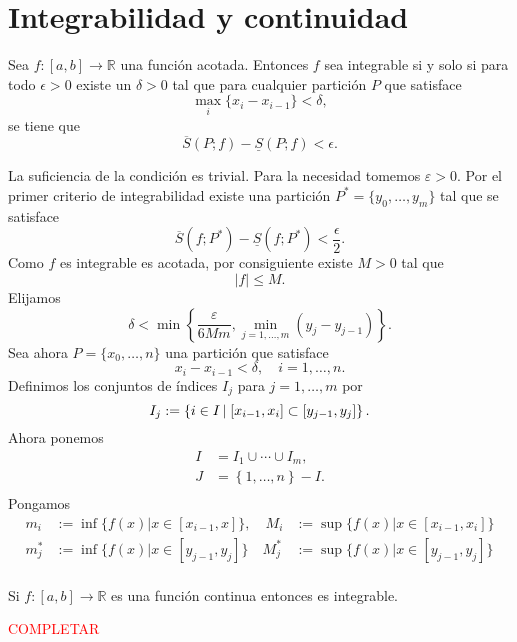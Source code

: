 \section{Integrabilidad y continuidad}


 
\begin{teorema}{}  Sea $f:[a,b]\to\mathbb{R}$ una función acotada. Entonces  $f$ sea integrable si y solo si para todo $\epsilon>0$ existe un $\delta>0$ tal que para cualquier partición $P$ que satisface
\[\max_i\{x_i-x_{i-1}\}<\delta,\]
se tiene que
\begin{equation}\label{eq:Crit1Int}
 \overline{S}(P;f)-\underline{S}(P;f)<\epsilon.
\end{equation}
 
\end{teorema}
\begin{demo} La suficiencia de la condición es trivial. Para la necesidad tomemos $\varepsilon>0$. Por el primer criterio de integrabilidad existe una partición $P^*=\{y_0,\ldots,y_m\}$ tal que se satisface
\[
 \overline{S}(f;P^*)-\underline{S}(f;P^*)<\frac{\epsilon}{2}.
\]
Como $f$ es integrable es acotada, por consiguiente existe $M>0$ tal que
\[
 |f|\leq M.
\]
Elijamos 
\[
 \delta<\min\left\{\frac{\varepsilon}{6Mm},\min_{j=1,\ldots,m}(y_j-y_{j-1})   \right\}  .
\]
Sea ahora $P=\{x_0,\ldots,n\}$ una partición que satisface
\[
 x_i-x_{i-1}<\delta,\quad i=1,\ldots,n.
\]
Definimos los conjuntos de índices $I_j$ para $j=1,\ldots,m$ por
\[
 I_j:=\left\{ i\in I\left|\vphantom{ \exists }\right.   [x_{i-1},x_i]\subset [y_{j-1},y_j]\right\}.
\]
Ahora ponemos
\[
\begin{split}
  I&=I_1\cup\cdots\cup I_m,\\
  J&=\left\{1,\ldots,n\right\}-I.\\
\end{split}
\]
Pongamos
\begin{eqnarray*}
     m_i&:=\inf\{f(x)| x\in [x_{i-1},x]\},\quad     M_i&:=\sup\{f(x)| x\in [x_{i-1},x_i]\}\\
    m^*_j&:=\inf\{f(x)| x\in [y_{j-1},y_j]\}\quad
    M^*_j&:=\sup\{f(x)| x\in [y_{j-1},y_j]\}\\
\end{eqnarray*}



 
\end{demo}

\begin{teorema}{}  Si $f:[a,b]\to\mathbb{R}$ es una función continua entonces es integrable.
\end{teorema}
\begin{demo}  \textcolor{red}{COMPLETAR}
 \end{demo}

